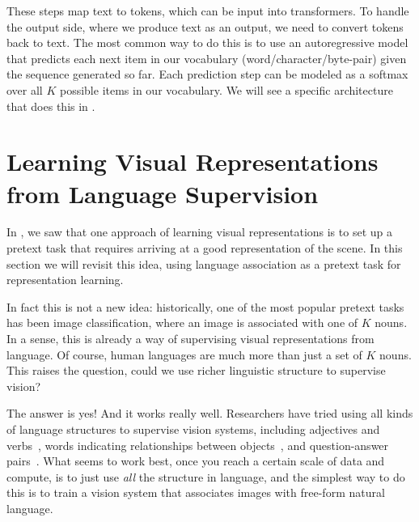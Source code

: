 
These steps map text to tokens, which can be input into transformers. To handle the output side, where we produce text as an output, we need to convert tokens back to text. The most common way to do this is to use an autoregressive model that predicts each next item in our vocabulary (word/character/byte-pair) given the sequence generated so far. Each prediction step can be modeled as a softmax over all $K$ possible items in our vocabulary. We will see a specific architecture that does this in \sect{\ref{sec:VLMs:im2text}}.


\section{Learning Visual Representations from Language Supervision}\label{sec:VLMs:CLIP}

In \chap{\ref{chapter:representation_learning}}, we saw that one approach of learning visual representations is to set up a pretext task that requires arriving at a good representation of the scene. In this section we will revisit this idea, using language association as a pretext task for representation learning.

In fact this is not a new idea: historically, one of the most popular pretext tasks has been image classification, where an image is associated with one of $K$ nouns. In a sense, this is already a way of supervising visual representations from language. Of course, human languages are much more than just a set of $K$ nouns. This raises the question, could we use richer linguistic structure to supervise vision?

The answer is yes! And it works really well. Researchers have tried using all kinds of language structures to supervise vision systems, including adjectives and verbs~\cite{StatesAndTransformations}, words indicating relationships between objects~\cite{visualgenome}, and question-answer pairs~\cite{antol2015vqa}. What seems to work best, once you reach a certain scale of data and compute, is to just use \textit{all} the structure in language, and the simplest way to do this is to train a vision system that associates images with free-form natural language.


